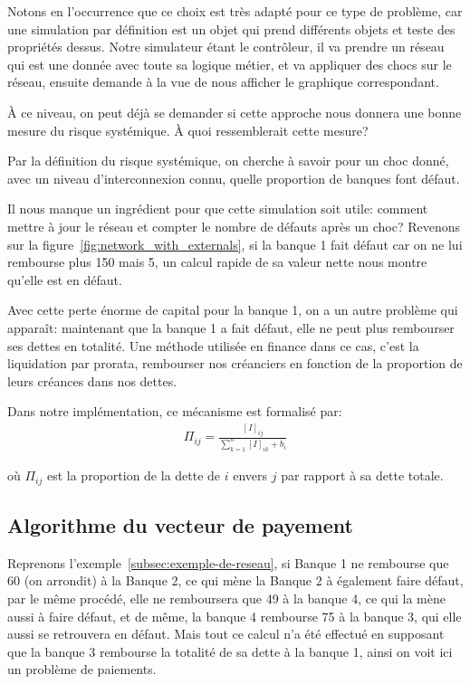 Notons en l'occurrence que ce choix est très adapté pour ce type de problème, car une simulation par définition est un objet qui prend différents objets et teste des propriétés dessus. Notre simulateur étant le contrôleur, il va prendre un réseau qui est une donnée avec toute sa logique métier, et va appliquer des chocs sur le réseau, ensuite demande à la vue de nous afficher le graphique correspondant.

À ce niveau, on peut déjà se demander si cette approche nous donnera une bonne mesure du risque systémique.
À quoi ressemblerait cette mesure?

Par la définition du risque systémique, on cherche à savoir pour un choc donné, avec un niveau d'interconnexion connu, quelle proportion de banques font défaut.

Il nous manque un ingrédient pour que cette simulation soit utile: comment mettre à jour le réseau et compter le nombre de défauts après un choc? Revenons sur la figure~\ref{fig:network_with_externals}, si la banque 1 fait défaut car on ne lui rembourse plus 150 mais 5, un calcul rapide de sa valeur nette nous montre qu'elle est en défaut.

Avec cette perte énorme de capital pour la banque 1, on a un autre problème qui apparaît: maintenant que la banque 1 a fait défaut, elle ne peut plus rembourser ses dettes en totalité. Une méthode utilisée en finance dans ce cas, c'est la liquidation par prorata, rembourser nos créanciers en fonction de la proportion de leurs créances dans nos dettes.

Dans notre implémentation, ce mécanisme est formalisé par:
\begin{align*}
    \Pi_{ij} = \frac{[I]_{ij}}{\sum_{k=1}^{n} [I]_{ik} + b_i}
\end{align*}

où $\Pi_{ij}$ est la proportion de la dette de $i$ envers $j$ par rapport à sa dette totale.

\subsection{Algorithme du vecteur de payement}\label{subsec:algorithme-du-vecteur-de-payement}
Reprenons l'exemple~\ref{subsec:exemple-de-reseau}, si Banque 1 ne rembourse que 60 (on arrondit) à la Banque 2, ce qui mène la Banque 2 à également faire défaut, par le même procédé, elle ne remboursera que 49 à la banque 4, ce qui la mène aussi à faire défaut, et de même, la banque 4 rembourse 75 à la banque 3, qui elle aussi se retrouvera en défaut. Mais tout ce calcul n'a été effectué en supposant que la banque 3 rembourse la totalité de sa dette à la banque 1, ainsi on voit ici un problème de paiements.


